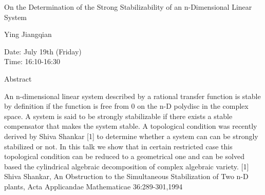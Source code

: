 \begin{center}
\LARGE
On the Determination of the Strong Stabilizability of an
                 n-Dimensional Linear System
\end{center}

\begin{center}
\Large
Ying Jiangqian

\end{center}

\noindent
Date:  July 19th (Friday) \\
Time:  16:10-16:30\\

\begin{center}
\large
Abstract
\end{center}

An n-dimensional linear system described by a rational transfer function is stable by definition if
the function is free from 0 on the n-D polydisc in the complex space. A system is said to be
strongly stabilizable if there exists a stable compensator that makes the system stable. A
topological condition was recently derived by Shiva Shankar [1] to determine whether a system can
can be strongly stabilized or not. In this talk we show that in certain restricted case this topological
condition can be reduced to a geometrical one and can be solved based the cylindrical algebraic
decomposition of complex algebraic variety. [1] Shiva Shankar, An Obstruction to the
Simultaneous Stabilization of Two n-D plants, Acta Applicandae Mathematicae 36:289-301,1994 

